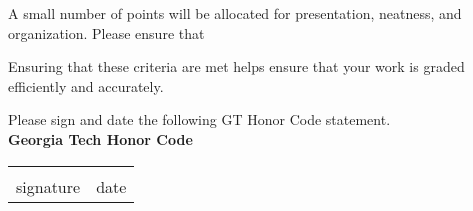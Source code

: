 \documentclass[12pt]{exam}
\begin{document}
\begin{questions}
\newpage

    \question[1] A small number of points will be allocated for presentation, neatness, and organization. Please ensure that
    Ensuring that these criteria are met helps ensure that your work is graded efficiently and accurately. 

\end{questions}

   Please sign and date the following GT Honor Code statement. \\ 
    
    \vspace{6pt}
    \textbf{Georgia Tech Honor Code}\\
    \GTHonorCode
    
    \begin{center}
    \begin{center}
        \def\arraystretch{0.35}%
        \begin{tabular}{ b{8cm} b{8cm} }
        \vspace{.5cm} \underline{\hspace{7cm}} & \vspace{.5cm} \underline{\hspace{4.5cm}}  \tabularnewline
        \vspace{6pt} signature & \vspace{6pt} date    
        \end{tabular}
    \end{center}
    \end{center}    
\end{document}
